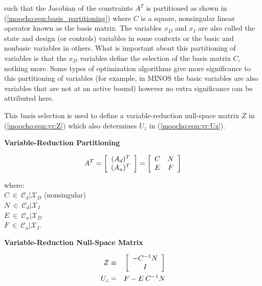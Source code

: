 \documentclass[pdf,ps2pdf,11pt]{SANDreport}
\begin{document}
such that the Jacobian of the constraints $A^T$ is partitioned as shown in
(\ref{moocho:eqn:basis_partitioning}) where $C$ is a square, nonsingular
linear operator known as the basis matrix.  The variables $x_D$ and $x_I$ are
also called the state and design (or controls) variables
{}\cite{GBiros_OGhattas_1999a} in some contexts or the basic and nonbasic
variables {}\cite{ref:murtagh_minos_1995} in others.  What is important about
this partitioning of variables is that the $x_D$ variables define the
selection of the basis matrix $C$, nothing more.  Some types of optimization
algorithms give more significance to this partitioning of variables (for
example, in MINOS {}\cite{ref:murtagh_minos_1995} the basic variables are also
variables that are not at an active bound) however no extra significance can
be attributed here.

This basis selection is used to define a variable-reduction null-space matrix
$Z$ in (\ref{moocho:eqn:vr:Z}) which also determines $U_z$ in
(\ref{moocho:eqn:vr:Uz}).

{\bsinglespace
\begin{center}\textbf{Variable-Reduction Partitioning}\end{center}
\begin{equation}
A^T =
{\bmat{c}
(A_d)^T \\
(A_u)^T
\emat}
=
{\bmat{cc}
C & N \\
E & F
\emat}
\label{moocho:eqn:basis_partitioning}
\end{equation} 
\begin{tabbing}
\hspace{4ex}where:\hspace{5ex}\= \\
\>	$C \:\in\:\mathcal{C}_d|\mathcal{X}_D$ \hspace{4ex} (nonsingular)\\
\>	$N \:\in\:\mathcal{C}_d|\mathcal{X}_I$ \\
\>	$E \:\in\:\mathcal{C}_u|\mathcal{X}_D$ \\
\>	$F \:\in\:\mathcal{C}_u|\mathcal{X}_I$.
\end{tabbing}

\begin{center}\textbf{Variable-Reduction Null-Space Matrix}\end{center}
\begin{eqnarray}
Z & \equiv & {\bmat{c} - C^{-1} N \\ I \emat}       \label{moocho:eqn:vr:Z}  \\
U_z & = & F - E \: C^{-1} N                         \label{moocho:eqn:vr:Uz} 
\end{eqnarray}
\esinglespace}
\end{document}
